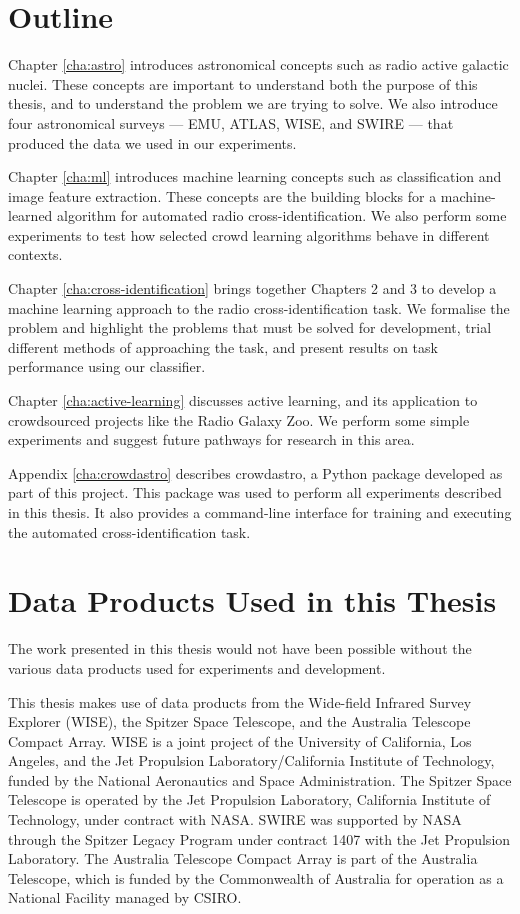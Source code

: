 \section{Outline}
\label{sec:outline}
  
  Chapter \ref{cha:astro} introduces astronomical concepts such as radio active
  galactic nuclei. These concepts are important to understand both the purpose
  of this thesis, and to understand the problem we are trying to solve. We also
  introduce four astronomical surveys --- EMU, ATLAS, WISE, and SWIRE --- that
  produced the data we used in our experiments.

  Chapter \ref{cha:ml} introduces machine learning concepts such as
  classification and image feature extraction. These concepts are the building
  blocks for a machine-learned algorithm for automated radio
  cross-identification. We also perform some experiments to test how selected
  crowd learning algorithms behave in different contexts.

  Chapter \ref{cha:cross-identification} brings together Chapters 2 and 3 to
  develop a machine learning approach to the radio cross-identification task. We
  formalise the problem and highlight the problems that must be solved for
  development, trial different methods of approaching the task, and present
  results on task performance using our classifier.

  Chapter \ref{cha:active-learning} discusses active learning, and its
  application to crowdsourced projects like the Radio Galaxy Zoo. We perform
  some simple experiments and suggest future pathways for research in this area.

  Appendix \ref{cha:crowdastro} describes crowdastro, a Python package developed
  as part of this project. This package was used to perform all experiments
  described in this thesis. It also provides a command-line interface for
  training and executing the automated cross-identification task.

\section{Data Products Used in this Thesis}
\label{sec:data-products}
  
  The work presented in this thesis would not have been possible without the
  various data products used for experiments and development.

  This thesis makes use of data products from the Wide-field Infrared Survey
  Explorer (WISE), the Spitzer Space Telescope, and the Australia Telescope
  Compact Array. WISE is a joint project of the University of California, Los
  Angeles, and the Jet Propulsion Laboratory/California Institute of Technology,
  funded by the National Aeronautics and Space Administration. The Spitzer Space
  Telescope is operated by the Jet Propulsion Laboratory, California Institute
  of Technology, under contract with NASA. SWIRE was supported by NASA through
  the Spitzer Legacy Program under contract 1407 with the Jet Propulsion
  Laboratory. The Australia Telescope Compact Array is part of the Australia
  Telescope, which is funded by the Commonwealth of Australia for operation as a
  National Facility managed by CSIRO.

